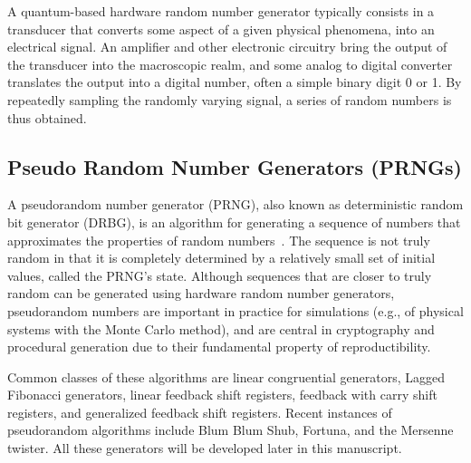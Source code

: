A quantum-based hardware random number generator typically consists in a transducer that converts some aspect of a given physical phenomena, into an electrical signal. An amplifier and other electronic circuitry bring the output of the transducer into the macroscopic realm, and some analog to digital converter translates the output into a digital number, often a simple binary digit 0 or 1. By repeatedly sampling the randomly varying signal, a series of random numbers is thus obtained.

\subsection{Pseudo Random Number Generators (PRNGs)}

A pseudorandom number generator (PRNG), also known as deterministic random bit generator (DRBG), is an algorithm for generating a sequence of numbers that approximates the properties of random numbers~\cite{Barker05recommendationfor}. The sequence is not truly random in that it is completely determined by a relatively small set of initial values, called the PRNG's state. Although sequences that are closer to truly random can be generated using hardware random number generators, pseudorandom numbers are important in practice for simulations (e.g., of physical systems with the Monte Carlo method), and are central in   cryptography and procedural generation due to their fundamental property of reproductibility. 

Common classes of these algorithms are linear congruential generators, Lagged Fibonacci generators, linear feedback shift registers, feedback with carry shift registers, and generalized feedback shift registers. Recent instances of pseudorandom algorithms include Blum Blum Shub, Fortuna, and the Mersenne twister.
All these generators will be developed later in this manuscript.

